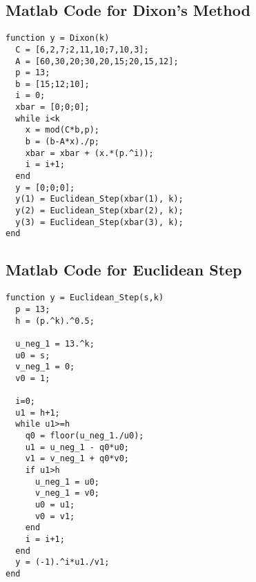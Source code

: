 \documentclass[12pt]{article}
\theoremstyle{plain}
\begin{document}
\subsection{Matlab Code for Dixon's Method}
\begin{verbatim}
function y = Dixon(k)
  C = [6,2,7;2,11,10;7,10,3];
  A = [60,30,20;30,20,15;20,15,12];
  p = 13;
  b = [15;12;10];
  i = 0;
  xbar = [0;0;0];
  while i<k
    x = mod(C*b,p);
    b = (b-A*x)./p;
    xbar = xbar + (x.*(p.^i));
    i = i+1;
  end
  y = [0;0;0];
  y(1) = Euclidean_Step(xbar(1), k);
  y(2) = Euclidean_Step(xbar(2), k);
  y(3) = Euclidean_Step(xbar(3), k);
end
\end{verbatim}

\subsection{Matlab Code for Euclidean Step}
\begin{verbatim}
function y = Euclidean_Step(s,k)
  p = 13;
  h = (p.^k).^0.5;

  u_neg_1 = 13.^k;
  u0 = s;
  v_neg_1 = 0;
  v0 = 1;

  i=0;
  u1 = h+1;
  while u1>=h 
    q0 = floor(u_neg_1./u0);
    u1 = u_neg_1 - q0*u0;
    v1 = v_neg_1 + q0*v0;
    if u1>h 
      u_neg_1 = u0;
      v_neg_1 = v0;
      u0 = u1;
      v0 = v1;
    end 
    i = i+1;
  end
  y = (-1).^i*u1./v1;
end
\end{verbatim}
\end{document}
